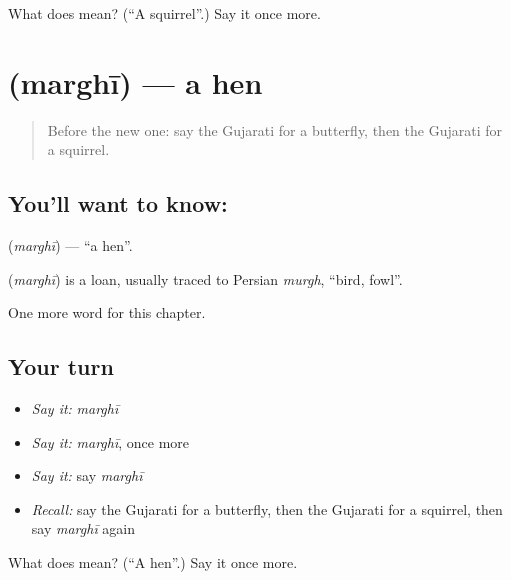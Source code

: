 \begin{tcolorbox}[breakable,colback=teal!4,colframe=teal!35!black,title={Before you move on}]
What does  mean? (\textquotedblleft{}A squirrel\textquotedblright{}.) Say it once more.
\end{tcolorbox}
\section[\texorpdfstring{\gu{મરઘી} (marghī)}{મરઘી (marghī)}]{ (marghī) — a hen}

\label{lesson:GU-C124-marghi}



\begin{quote}
Before the new one: say the Gujarati for a butterfly, then the Gujarati for a squirrel.
\end{quote}

\subsection*{You'll want to know: }
\textbf{} (\emph{marghī}) — \textquotedblleft{}a hen\textquotedblright{}.

\begin{cousinweb}
\textbf{} (\emph{marghī}) is a loan, usually traced to Persian \emph{murgh}, \textquotedblleft{}bird, fowl\textquotedblright{}.
\end{cousinweb}

\begin{grammarlens}[title={What you've built}]
One more word for this chapter.
\end{grammarlens}

\subsection*{Your turn}
\begin{itemize}
\raggedright
  \item \emph{Say it:} \emph{marghī}
  \item \emph{Say it:} \emph{marghī}, once more
  \item \emph{Say it:} say \emph{marghī}
  \item \emph{Recall:} say the Gujarati for a butterfly, then the Gujarati for a squirrel, then say \emph{marghī} again
\end{itemize}

\begin{tcolorbox}[breakable,colback=teal!4,colframe=teal!35!black,title={Before you move on}]
What does  mean? (\textquotedblleft{}A hen\textquotedblright{}.) Say it once more.
\end{tcolorbox}
